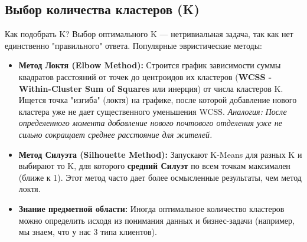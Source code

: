 \subsection{Выбор количества кластеров (K)}
\begin{myexampleblock}{Как подобрать K?}
    Выбор оптимального K — нетривиальная задача, так как нет единственно "правильного" ответа. Популярные эвристические методы:
    \begin{itemize}
        \item \textbf{Метод Локтя (Elbow Method):} Строится график зависимости суммы квадратов расстояний от точек до центроидов их кластеров (\textbf{WCSS - Within-Cluster Sum of Squares} или инерция) от числа кластеров K. Ищется точка "изгиба" (локтя) на графике, после которой добавление нового кластера уже не дает существенного уменьшения WCSS. \textit{Аналогия: После определенного момента добавление нового почтового отделения уже не сильно сокращает среднее расстояние для жителей.}
        \item \textbf{Метод Силуэта (Silhouette Method):} Запускают K-Means для разных K и выбирают то K, для которого \textbf{средний Силуэт} по всем точкам максимален (ближе к 1). Этот метод часто дает более осмысленные результаты, чем метод локтя.
        \item \textbf{Знание предметной области:} Иногда оптимальное количество кластеров можно определить исходя из понимания данных и бизнес-задачи (например, мы знаем, что у нас 3 типа клиентов).
    \end{itemize}
\end{myexampleblock}

\begin{center}
\end{center}

